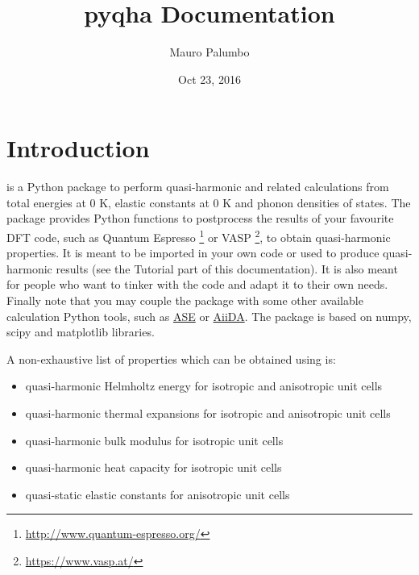 \documentclass[letterpaper,10pt,english]{sphinxmanual}
\title{pyqha Documentation}
\date{Oct 23, 2016}
\author{Mauro Palumbo}
\begin{document}
\maketitle
\tableofcontents
{}\label{index::doc}



\chapter{Introduction}
\label{introduction:introduction}\label{introduction:welcome-to-pyqha-s-documentation}\label{introduction::doc}\label{introduction:id1}
 is a Python package to perform quasi-harmonic and related calculations from total energies at 0 K, elastic constants at 0 K and phonon densities of states. The package provides Python functions to postprocess the results of your favourite DFT code, such as Quantum Espresso \footnote[1]{\sphinxAtStartFootnote
\url{http://www.quantum-espresso.org/}
} or VASP \footnote[2]{\sphinxAtStartFootnote
\url{https://www.vasp.at/}
}, to obtain quasi-harmonic properties. It is meant to be imported in your own code or used to produce quasi-harmonic results (see the Tutorial part of this documentation). It is also meant for people who want to tinker with the code and adapt it to their own needs. Finally note that you may couple the package with some other available calculation Python tools, such as \href{https://wiki.fysik.dtu.dk/ase/about.html}{ASE} or \href{http://www.aiida.net/}{AiiDA}.
The package is based on numpy, scipy and matplotlib libraries.

A non-exhaustive list of properties which can be obtained using  is:
\begin{itemize}
\item {} 
quasi-harmonic Helmholtz energy for isotropic and anisotropic unit cells

\item {} 
quasi-harmonic thermal expansions for isotropic and anisotropic unit cells

\item {} 
quasi-harmonic bulk modulus for isotropic unit cells

\item {} 
quasi-harmonic heat capacity for isotropic unit cells

\item {} 
quasi-static elastic constants for anisotropic unit cells

\end{itemize}
\end{document}
